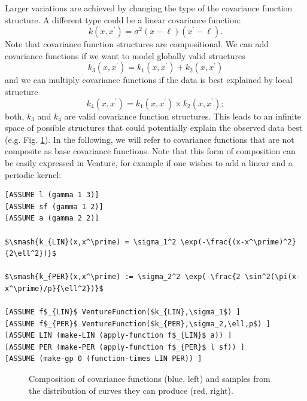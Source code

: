 \documentclass{article} %
\begin{document}
Larger variations are achieved by changing the type of the covariance function structure. A different type could be a linear covariance function:
\begin{equation}
 k(x,x^\prime) = \sigma^2 (x-\ell) (x^\prime-\ell). 
\end{equation}
Note that covariance function structures are compositional. We can add covariance functions if we want to model globally valid structures
\begin{equation}
k_3(x,x^\prime) = k_1(x,x^\prime) + k_2(x,x^\prime)
\end{equation}
 and we can multiply covariance functions if the data is best explained by local structure 
\begin{equation}
k_4(x,x^\prime) = k_1(x,x^\prime) \times k_2(x,x^\prime);
\end{equation}
both, $k_3$ and $k_4$ are valid covariance function structures. This leads to an infinite space of possible structures that could potentially explain the observed data best (e.g. Fig. \ref{fig:composite}). In the following, we will refer to covariance functions that are not composite as base covariance functions. Note that this form of composition can be easily expressed in Venture, for example if one wishes to add a linear and a periodic kernel:

\begin{minipage}{\linewidth}

\begin{lstlisting}[frame=single,label=alg:gpNeal,caption=LIN $\times$ PER,mathescape]
[ASSUME l (gamma 1 3)]
[ASSUME sf (gamma 1 2)]
[ASSUME a (gamma 2 2)]

$\smash{k_{LIN}(x,x^\prime) = \sigma_1^2 \exp(-\frac{(x-x^\prime)^2}{2\ell^2})}$

$\smash{k_{PER}(x,x^\prime) := \sigma_2^2 \exp(-\frac{2 \sin^2(\pi(x-x^\prime)/p}{\ell^2})}$

[ASSUME f$_{LIN}$ VentureFunction($k_{LIN},\sigma_1$) ]
[ASSUME f$_{PER}$ VentureFunction($k_{PER},\sigma_2,\ell,p$) ]
[ASSUME LIN (make-LIN (apply-function f$_{LIN}$ a)) ]
[ASSUME PER (make-PER (apply-function f$_{PER}$ l sf)) ]
[ASSUME (make-gp 0 (function-times LIN PER)) ]
\end{lstlisting}

\end{minipage}




\begin{figure}[p]
\centering
    \label{fig:composite}
    \caption{Composition of covariance functions (blue, left) and samples from the distribution of curves they can produce (red, right).}
\end{figure}
\end{document}
